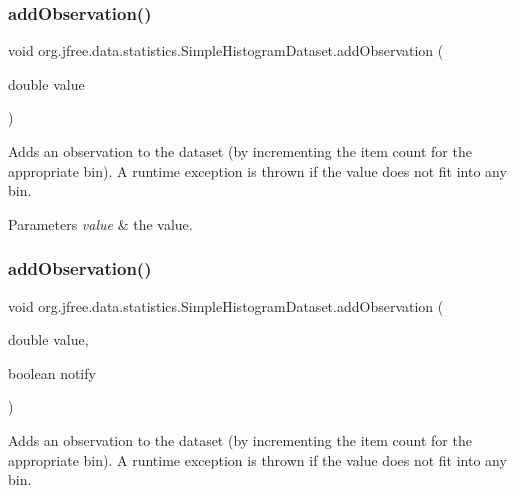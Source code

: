\subsubsection{\texorpdfstring{add\+Observation()}{addObservation()}\hspace{0.1cm}{\footnotesize\ttfamily [1/2]}}
{\footnotesize\ttfamily void org.\+jfree.\+data.\+statistics.\+Simple\+Histogram\+Dataset.\+add\+Observation (\begin{DoxyParamCaption}\item[{double}]{value }\end{DoxyParamCaption})}

Adds an observation to the dataset (by incrementing the item count for the appropriate bin). A runtime exception is thrown if the value does not fit into any bin.


\begin{DoxyParams}{Parameters}
{\em value} & the value. \\
\hline
\end{DoxyParams}
\mbox{\label{classorg_1_1jfree_1_1data_1_1statistics_1_1_simple_histogram_dataset_adf7f5a92447afd39dc0852a15d4f67d5}} 
\subsubsection{\texorpdfstring{add\+Observation()}{addObservation()}\hspace{0.1cm}{\footnotesize\ttfamily [2/2]}}
{\footnotesize\ttfamily void org.\+jfree.\+data.\+statistics.\+Simple\+Histogram\+Dataset.\+add\+Observation (\begin{DoxyParamCaption}\item[{double}]{value,  }\item[{boolean}]{notify }\end{DoxyParamCaption})}

Adds an observation to the dataset (by incrementing the item count for the appropriate bin). A runtime exception is thrown if the value does not fit into any bin.


